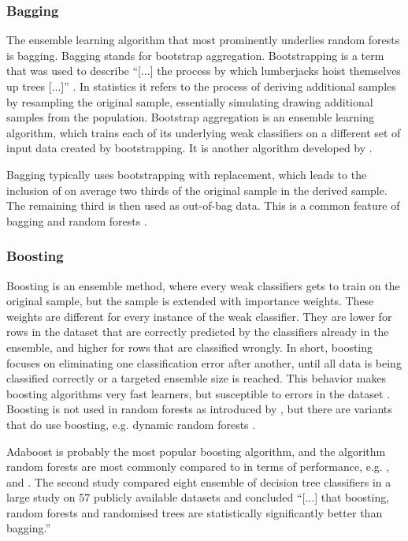 \documentclass[a4paper,man,12pt,apacite,floatsintext,draftfirst]{apa6} %
\begin{document}
\subsubsection{Bagging}

The ensemble learning algorithm that most prominently underlies
random forests is bagging. Bagging stands for bootstrap aggregation.
Bootstrapping is a term that was used to describe
“[...] the process by which lumberjacks hoist themselves up trees [...]”
\cite{wpBOOT}.
In statistics it refers to the process of deriving additional samples
by resampling the original sample,
essentially simulating drawing additional samples from the population.
Bootstrap aggregation is an ensemble learning algorithm,
which trains each of its underlying weak classifiers on a different set
of input data created by bootstrapping.
It is another algorithm developed by .

Bagging typically uses bootstrapping with replacement,
which leads to the inclusion of on average two thirds of the original sample
in the derived sample.
The remaining third is then used as out-of-bag data.
This is a common feature of bagging and random forests \cite{breiman2001random}.

\subsubsection{Boosting}

Boosting is an ensemble method, where every weak classifiers gets to train
on the original sample, but the sample is extended with importance weights.
These weights are different for every instance of the weak classifier.
They are lower for rows in the dataset that are correctly predicted by
the classifiers already in the ensemble,
and higher for rows that are classified wrongly.
In short, boosting focuses on eliminating one classification error after
another, until all data is being classified correctly
or a targeted ensemble size is reached.
This behavior makes boosting algorithms very fast learners,
but susceptible to errors in the dataset \cite{long2010random}.
Boosting is not used in random forests as introduced by ,
but there are variants that do use boosting, e.g.
dynamic random forests \cite{bernard2012dynamic}.

Adaboost \cite{freund1995decision} is probably the most popular
boosting algorithm, and the algorithm random forests are most commonly
compared to in terms of performance, e.g. ,
 and .
The second study compared eight ensemble of decision tree classifiers in a
large study on 57 publicly available datasets and concluded
“[...] that boosting, random forests and randomised trees are
statistically significantly better than bagging.”
\end{document}
